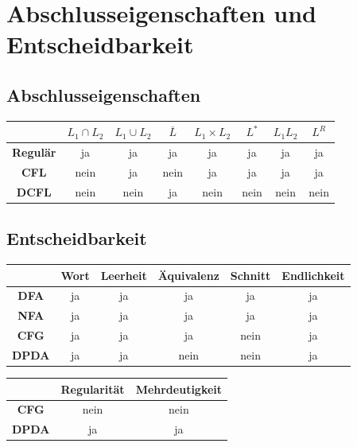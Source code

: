 \documentclass[ieeetran]{article}
\begin{document}
\section{Abschlusseigenschaften und Entscheidbarkeit} %
\label{sec:überblick_abschlusseigenschaften_und_entscheidbarkeit}

\subsection{Abschlusseigenschaften} %
\label{sub:abschlusseigenschaften}

\begin{tabular}{|c||c||c||c||c||c||c||c|}
\hline
 & $L_1\cap L_2$ & $L_1 \cup L_2$ & $\overline{L}$ & $L_1\times L_2$ & $L^*$ & $L_1L_2$ & $L^R$ \\ \hline
	\textbf{Regulär} & ja & ja & ja & ja & ja & ja & ja\\ \hline
\textbf{CFL} & nein & ja & nein & ja & ja & ja & ja\\ \hline
\textbf{DCFL} & nein & nein & ja & nein & nein & nein & nein \\ \hline
\end{tabular}

\pagebreak

\subsection{Entscheidbarkeit} %
\label{sub:entscheidbarkeit}

\begin{tabular}{|c||c||c||c||c||c|}
\hline
 & \textbf{Wort} & \textbf{Leerheit} & \textbf{Äquivalenz} & \textbf{Schnitt} & \textbf{Endlichkeit} \\ \hline
	\textbf{DFA} & ja & ja & ja & ja & ja\\ \hline
\textbf{NFA} & ja & ja & ja & ja & ja \\ \hline
\textbf{CFG} & ja & ja & ja & nein & ja \\ \hline
\textbf{DPDA} & ja & ja & nein & nein & ja \\ \hline
\end{tabular}

\vspace*{0.5cm}

\hspace{-0.52cm}\begin{tabular}{|c||c||c|}
\hline
 & \textbf{Regularität} & \textbf{Mehrdeutigkeit} \\ \hline
\textbf{CFG} & nein & nein  \\ \hline
\textbf{DPDA} & ja & ja  \\ \hline
\end{tabular}
\end{document}
